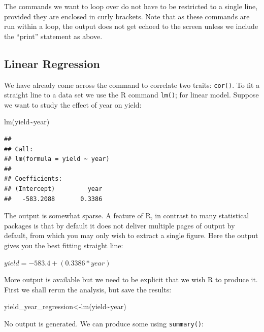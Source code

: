 \documentclass[
]{book}
\newenvironment{Shaded}{\begin{snugshade}}{\end{snugshade}}
\newcommand{\FunctionTok}[1]{\textcolor[rgb]{0.00,0.00,0.00}{#1}}
\newcommand{\NormalTok}[1]{#1}
\newcommand{\OtherTok}[1]{\textcolor[rgb]{0.56,0.35,0.01}{#1}}
\newcommand{\SpecialCharTok}[1]{\textcolor[rgb]{0.00,0.00,0.00}{#1}}
\begin{document}
The commands we want to loop over do not have to be restricted to a single line, provided they are enclosed in curly brackets. Note that as these commands are run within a loop, the output does not get echoed to the screen unless we include the ``print'' statement as above.

\hypertarget{linear-regression}{%
\subsection{Linear Regression}\label{linear-regression}}

We have already come across the command to correlate two traits: \texttt{cor()}. To fit a straight line to a data set we use the R command \texttt{lm()}; for linear model. Suppose we want to study the effect of year on yield:

\begin{Shaded}
\begin{Highlighting}[]
\FunctionTok{lm}\NormalTok{(yield}\SpecialCharTok{\textasciitilde{}}\NormalTok{year)}
\end{Highlighting}
\end{Shaded}

\begin{verbatim}
## 
## Call:
## lm(formula = yield ~ year)
## 
## Coefficients:
## (Intercept)         year  
##   -583.2088       0.3386
\end{verbatim}

The output is somewhat sparse. A feature of R, in contrast to many statistical packages is that by default it does not deliver multiple pages of output by default, from which you may only wish to extract a single figure. Here the output gives you the best fitting straight line:

\(yield = -583.4 + (0.3386 * year)\)

More output is available but we need to be explicit that we wish R to produce it. First we shall rerun the analysis, but save the results:

\begin{Shaded}
\begin{Highlighting}[]
\NormalTok{yield\_year\_regression}\OtherTok{\textless{}{-}}\FunctionTok{lm}\NormalTok{(yield}\SpecialCharTok{\textasciitilde{}}\NormalTok{year)}
\end{Highlighting}
\end{Shaded}

No output is generated. We can produce some using \texttt{summary()}:
\end{document}
